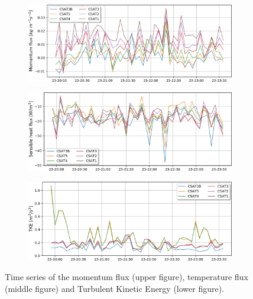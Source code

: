 \begin{figure}[!ht]
    \centering
    \begin{subfigure}[b]{0.65\textwidth}
        \includegraphics[width=\textwidth]{fig/chapter_4/23-24/Tau_23-24.png}
      \label{fig:Tau_23-24}
    \end{subfigure}
    \begin{subfigure}[b]{0.65\textwidth}
        \includegraphics[width=\textwidth]{fig/chapter_4/23-24/H23-24.png}
        \label{fig:H_23-24}
    \end{subfigure}
    \begin{subfigure}[b]{0.65\textwidth}
        \includegraphics[width=\textwidth]{fig/chapter_4/23-24/TKE23-24.png}
        \label{fig:TKE_23-24}
    \end{subfigure}
    \caption{Time series of the momentum flux (upper figure), temperature flux (middle figure) and Turbulent Kinetic Energy (lower figure).  }
    \label{fig:23-24_flux_series}
\end{figure}

